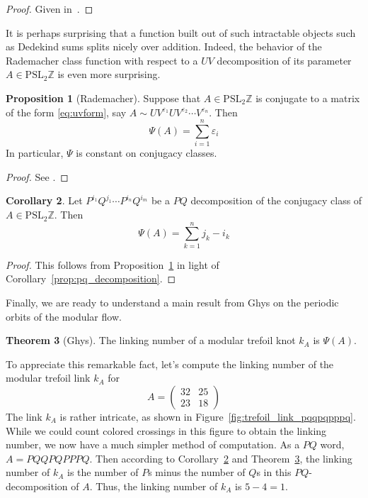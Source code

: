 \documentclass[12pt,twoside]{reedthesis}
\theoremstyle{definition}
\newtheorem{thm}{Theorem}[chapter]
\newtheorem{cor}[thm]{Corollary}
\newtheorem{prop}[thm]{Proposition}
\newcommand{\Z}{\mathbb{Z}}
\newcommand{\PSLZ}{\mathrm{PSL}_2{\Z}}
\begin{document}
\begin{proof}
  Given in~\cite{rademacher1956}.
\end{proof}

It is perhaps surprising that a function built out of such intractable objects such as Dedekind sums splits nicely over addition. Indeed, the behavior of the Rademacher class function with respect to a $UV$ decomposition of its parameter $A \in \PSLZ$ is even more surprising.

\begin{prop}[Rademacher]\label{prop:rademacher_class_sum}
  Suppose that $A \in \PSLZ$ is conjugate to a matrix of the form \eqref{eq:uvform}, say $A \sim U V^{\varepsilon_1} U V^{\varepsilon_2} \cdots V^{\varepsilon_{n}}$.
  Then
  \begin{equation*}
    \Psi(A) = \sum_{i=1}^n \varepsilon_i
  \end{equation*}
  In particular, $\Psi$ is constant on conjugacy classes.
\end{prop}

\begin{proof}
  See \cite[58-60]{rademacher1972}.
\end{proof}

\begin{cor}\label{cor:rademacher_class_function_pq}
  Let $P^{i_1} Q^{j_1} \cdots P^{i_n} Q^{i_m}$ be a $PQ$ decomposition of the conjugacy class of $A \in \PSLZ$.
  Then
  \begin{equation*}
    \Psi(A) = \sum_{k=1}^n j_k - i_k
  \end{equation*}
\end{cor}

\begin{proof}
  This follows from Proposition~\ref{prop:rademacher_class_sum} in light of Corollary~\ref{prop:pq_decomposition}.
\end{proof}

Finally, we are ready to understand a main result from Ghys on the periodic orbits of the modular flow.

\begin{thm}[Ghys]\label{thm:ghys}
  The linking number of a modular trefoil knot $k_A$ is $\Psi(A)$.
\end{thm}

To appreciate this remarkable fact, let's compute the linking number of the modular trefoil link $k_A$ for
\begin{equation*}
  A = \begin{pmatrix}
    32 & 25 \\ 
    23 & 18
  \end{pmatrix}
\end{equation*}
The link $k_A$ is rather intricate, as shown in Figure~\ref{fig:trefoil_link_pqqpqpppq}.
While we could count colored crossings in this figure to obtain the linking number, we now have a much simpler method of computation.
As a $PQ$ word, $A = PQQPQPPPQ$.
Then according to Corollary~\ref{cor:rademacher_class_function_pq} and Theorem~\ref{thm:ghys}, the linking number of $k_A$ is the number of $P$s minus the number of $Q$s in this $PQ$-decomposition of $A$. 
Thus, the linking number of $k_A$ is $5 - 4 = 1$.
\end{document}
